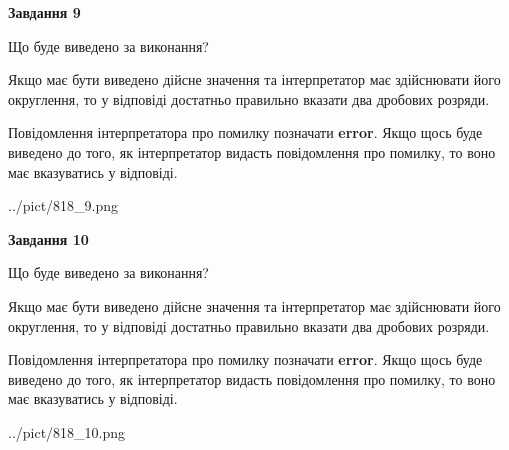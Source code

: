 \documentclass[12pt, ukrainian]{article}
\begin{document}
{\begin {Large}
{\begin {center}\textbf{Завдання 9}\end {center}}\par
Що буде виведено за виконання? \par

Якщо має бути виведено дійсне значення та інтерпретатор має здійснювати його округлення, 
то у відповіді достатньо правильно вказати два дробових розряди.

Повідомлення інтерпретатора про помилку позначати \textbf{error}.
Якщо щось буде виведено до того, як інтерпретатор видасть повідомлення про помилку, 
то воно має вказуватись у відповіді. \par

\begin{center}
	{../pict/818_9.png}
\end{center}
\newpage

{\begin {center}\textbf{Завдання 10}\end {center}}\par
Що буде виведено за виконання? \par

Якщо має бути виведено дійсне значення та інтерпретатор має здійснювати його округлення, 
то у відповіді достатньо правильно вказати два дробових розряди.

Повідомлення інтерпретатора про помилку позначати \textbf{error}.
Якщо щось буде виведено до того, як інтерпретатор видасть повідомлення про помилку, 
то воно має вказуватись у відповіді. \par

\begin{center}
	{../pict/818_10.png}
\end{center}
\newpage

\end {Large}}
\end{document}
